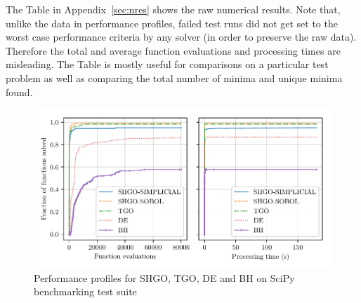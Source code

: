 The Table in Appendix~\ref{sec:nres} shows the raw numerical results. Note that, unlike the data in performance profiles, failed test runs did not get set to the worst case performance criteria by any solver (in order to preserve the raw data). Therefore the total and average function evaluations and processing times are misleading. The Table is mostly useful for comparisons on a particular test problem as well as comparing the total number of minima and unique minima found.





\begin{figure} %
\centerline{\includegraphics[scale=1.0]{./Fig12.pdf}}
{\caption{Performance profiles for SHGO, TGO, DE and BH on SciPy benchmarking test suite} \label{fig:pprofile}} 
\end{figure}

